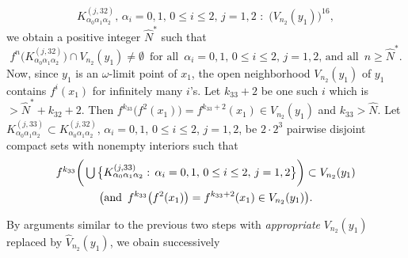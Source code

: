 \documentclass[12pt]{article}
\newcommand{\al}{\alpha}
\begin{document}
$$
K_{\al_0\al_1\al_2}^{(j,32)}, \, \al_i = 0, 1, \, 0 \le i \le 2, \, j = 1, 2 \,\, : \,\, \big(V_{n_2}(y_1)\big)^{16},
$$
we obtain a positive integer $\widehat N^*$ such that 
$$
f^n\big(K_{\al_0\al_1\al_2}^{(j,32)}\big) \cap V_{n_2}(y_1) \ne \emptyset \,\,\, \text{for all} \,\,\, \al_i = 0, 1, \, 0 \le i \le 2, \, j = 1, 2, \, \text{and all} \,\,\, n \ge \widehat N^*.
$$
\indent Now, since $y_1$ is an $\omega$-limit point of $x_1$, the open neighborhood $V_{n_2}(y_1)$ of $y_1$ contains $f^i(x_1)$ for infinitely many $i$'s.  Let $k_{33}+2$ be one such $i$ which is $> \widehat N^*+k_{32}+2$.  Then $f^{k_{33}}\big(f^2(x_1)\big) = f^{k_{33}+2}(x_1) \in V_{n_2}(y_1)$ and $k_{33} > \widehat N$.  Let $K_{\al_0\al_1\al_2}^{(j,33)} \subset K_{\al_0\al_1\al_2}^{(j,32)}$, $\al_i = 0, 1$, $0 \le i \le 2$, $j = 1, 2$, be $2 \cdot 2^3$ pairwise disjoint compact sets with nonempty interiors such that 
\begin{multline*}
$$
f^{k_{33}}\bigg(\bigcup \big\{ K_{\al_0\al_1\al_2}^{(j,33)}: \, \al_i = 0, 1, \, 0 \le i \le 2, \, j = 1, 2 \big\}\bigg) \subset V_{n_2}(y_1) \\ \big(\text{and} \,\,\, f^{k_{33}}\big(f^2(x_1)\big) = f^{k_{33}+2}(x_1) \in V_{n_2}(y_1)\big).
$$
\end{multline*}

\indent By arguments similar to the previous two steps with {\it appropriate} $V_{n_2}(y_1)$ replaced by $\widehat V_{n_2}(y_1)$, we obain successively
\end{document}
